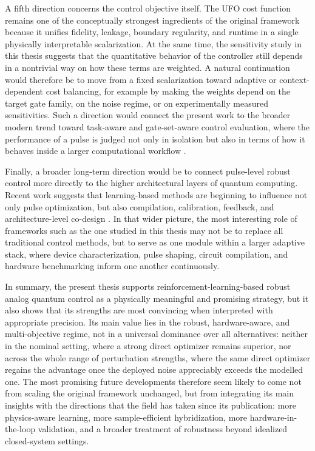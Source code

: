 A fifth direction concerns the control objective itself. The UFO cost function remains one of the conceptually strongest ingredients of the original framework because it unifies fidelity, leakage, boundary regularity, and runtime in a single physically interpretable scalarization. At the same time, the sensitivity study in this thesis suggests that the quantitative behavior of the controller still depends in a nontrivial way on how these terms are weighted. A natural continuation would therefore be to move from a fixed scalarization toward adaptive or context-dependent cost balancing, for example by making the weights depend on the target gate family, on the noise regime, or on experimentally measured sensitivities. Such a direction would connect the present work to the broader modern trend toward task-aware and gate-set-aware control evaluation, where the performance of a pulse is judged not only in isolation but also in terms of how it behaves inside a larger computational workflow \cite{Vetter2024}.

Finally, a broader long-term direction would be to connect pulse-level robust control more directly to the higher architectural layers of quantum computing. Recent work suggests that learning-based methods are beginning to influence not only pulse optimization, but also compilation, calibration, feedback, and architecture-level co-design \cite{Wang2024}. In that wider picture, the most interesting role of frameworks such as the one studied in this thesis may not be to replace all traditional control methods, but to serve as one module within a larger adaptive stack, where device characterization, pulse shaping, circuit compilation, and hardware benchmarking inform one another continuously.

In summary, the present thesis supports reinforcement-learning-based robust analog quantum control as a physically meaningful and promising strategy, but it also shows that its strengths are most convincing when interpreted with appropriate precision. Its main value lies in the robust, hardware-aware, and multi-objective regime, not in a universal dominance over all alternatives: neither in the nominal setting, where a strong direct optimizer remains superior, nor across the whole range of perturbation strengths, where the same direct optimizer regains the advantage once the deployed noise appreciably exceeds the modelled one. The most promising future developments therefore seem likely to come not from scaling the original framework unchanged, but from integrating its main insights with the directions that the field has taken since its publication: more physics-aware learning, more sample-efficient hybridization, more hardware-in-the-loop validation, and a broader treatment of robustness beyond idealized closed-system settings.


